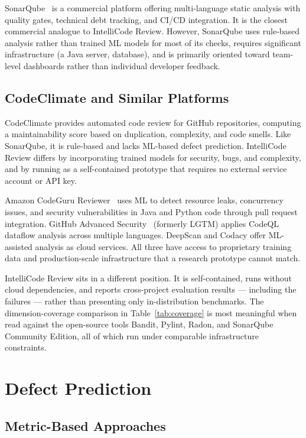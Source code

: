 \documentclass[12pt, oneside]{report}
\begin{document}
SonarQube~\cite{sonarqube} is a commercial platform offering multi-language static analysis
with quality gates, technical debt tracking, and CI/CD integration. It is the closest
commercial analogue to IntelliCode Review. However, SonarQube uses rule-based analysis
rather than trained ML models for most of its checks, requires significant infrastructure
(a Java server, database), and is primarily oriented toward team-level dashboards rather
than individual developer feedback.

\subsection{CodeClimate and Similar Platforms}

CodeClimate provides automated code review for GitHub repositories, computing a
maintainability score based on duplication, complexity, and code smells. Like SonarQube,
it is rule-based and lacks ML-based defect prediction. IntelliCode Review differs by
incorporating trained models for security, bugs, and complexity, and by running as a
self-contained prototype that requires no external service account or API key.

Amazon CodeGuru Reviewer~\cite{codeguru} uses ML to detect resource leaks, concurrency issues, and security vulnerabilities in Java and Python code through pull request integration. GitHub Advanced Security~\cite{ghadvancedsecurity} (formerly LGTM) applies CodeQL dataflow analysis across multiple languages. DeepScan and Codacy offer ML-assisted analysis as cloud services. All three have access to proprietary training data and production-scale infrastructure that a research prototype cannot match.

IntelliCode Review sits in a different position. It is self-contained, runs without cloud dependencies, and reports cross-project evaluation results — including the failures — rather than presenting only in-distribution benchmarks. The dimension-coverage comparison in Table~\ref{tab:coverage} is most meaningful when read against the open-source tools Bandit, Pylint, Radon, and SonarQube Community Edition, all of which run under comparable infrastructure constraints.

\section{Defect Prediction}
\label{sec:rel-defect}

\subsection{Metric-Based Approaches}
\end{document}
